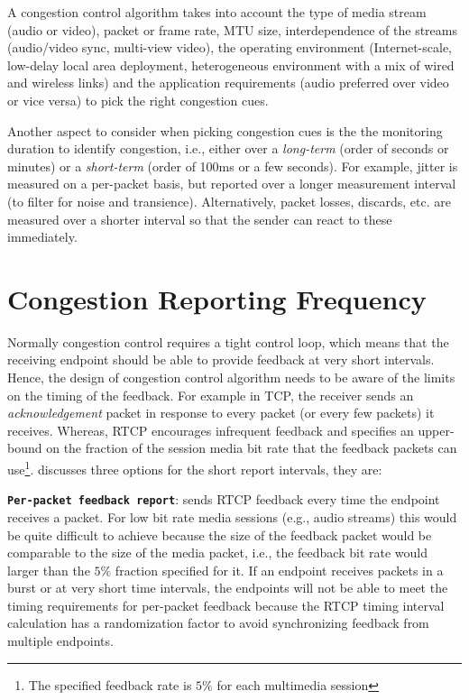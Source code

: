 A congestion control algorithm takes into account the type of media stream
(audio or video), packet or frame rate, MTU size, interdependence of the
streams (audio/video sync, multi-view video), the operating environment
(Internet-scale, low-delay local area deployment, heterogeneous environment
with a mix of wired and wireless links) and the application requirements
(audio preferred over video or vice versa) to pick the right congestion cues.

Another aspect to consider when picking congestion cues is the the monitoring
duration to identify congestion, i.e., either over a \emph{long-term} (order
of seconds or minutes) or a \emph{short-term} (order of 100ms or a few
seconds). For example, jitter is measured on a per-packet basis, but reported
over a longer measurement interval (to filter for noise and transience).
Alternatively, packet losses, discards, etc. are measured over a shorter
interval so that the sender can react to these immediately.

\section{Congestion Reporting Frequency}
\label{fw.freq}

Normally congestion control requires a tight control loop, which means that
the receiving endpoint should be able to provide feedback at very short
intervals. Hence, the design of congestion control algorithm needs to be aware
of the limits on the timing of the feedback. For example in TCP, the receiver
sends an \emph{acknowledgement} packet in response to every packet (or every
few packets) it receives. Whereas, RTCP encourages infrequent feedback and
specifies an upper-bound on the fraction of the session media bit rate that
the feedback packets can use\footnote{The specified feedback rate is $5\%$ for
each multimedia session}. \cite{draft.rmcat.feedback} discusses three options
for the short report intervals, they are:

\textbf{\texttt{Per-packet feedback report}}: sends RTCP feedback every time
the endpoint receives a packet. For low bit rate media sessions (e.g., audio
streams) this would be quite difficult to achieve because the size of the
feedback packet would be comparable to the size of the media packet, i.e., the
feedback bit rate would larger than the $5\%$ fraction specified for it. If an
endpoint receives packets in a burst or at very short time intervals, the
endpoints will not be able to meet the timing requirements for per-packet
feedback because the RTCP timing interval calculation has a randomization
factor to avoid synchronizing feedback from multiple endpoints.

